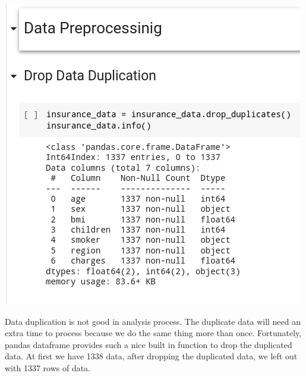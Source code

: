 \documentclass[a4paper, 12pt]{article}
\begin{document}
\begin{multicols}{2}
\centering
\vspace{0.2cm}
\includegraphics[scale=0.35]{drop_data_duplication}
\vspace{0.2cm}

\justifying
Data duplication is not good in analysis process. The duplicate data will need an extra time to process because we do the same thing more than once. Fortunately, pandas dataframe provides such a nice built in function to drop the duplicated data. At first we have 1338 data, after dropping the duplicated data, we left out with 1337 rows of data. 


\end{multicols}
\end{document}
